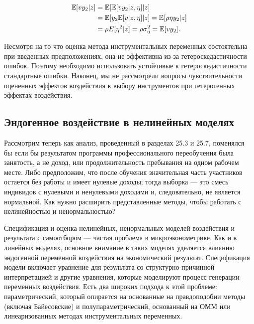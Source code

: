 \begin{align}
\label{eq25.75}
\mathbb{E}[vy_2|z] & = \mathbb{E}[\mathbb{E}[vy_2|z,\eta] | z]  \\
& = \mathbb{E}[y_2 \mathbb{E}[v|z,\eta] | z] = \mathbb{E}[\rho \eta y_2 | z] \nonumber \\
& = \rho E[\eta^2 | z] = \rho \sigma_{\eta}^2 = \mathbb{E}[v y_2]. \nonumber
\end{align}

Несмотря на то что оценка метода инструментальных переменных состоятельна при введенных предположениях, она не эффективна из-за гетероскедастичности ошибок. Поэтому необходимо использовать устойчивые к гетероскедастичности стандартные ошибки. Наконец, мы не рассмотрели вопросы чувствительности оцененных эффектов воздействия к выбору инструментов при гетерогенных эффектах воздействия. 

\subsection{Эндогенное воздействие в нелинейных моделях}

Рассмотрим теперь как анализ, проведенный в разделах 25.3 и 25.7, поменялся бы если бы результатом программы профессионального переобучения была занятость, а не доход, или продолжительность пребывания на одном рабочем месте. Либо предположим, что после обучения значительная часть участников остается без работы и имеет нулевые доходы; тогда выборка --- это смесь индивидов с нулевыми и ненулевыми доходами и, следовательно, не является нормальной. Как нужно расширить представленные методы, чтобы работать с нелинейностью и ненормальностью?

Спецификация и оценка нелинейных, ненормальных моделей воздействия и результата с самоотбором --- частая проблема в микроэконометрике. Как и в линейных моделях, основное внимание в таких моделях уделяется влиянию эндогенной переменной воздействия на экономический результат. Спецификация модели включает уравнение для результата со структурно-причинной интерпретацией и другие уравнения, которые моделируют процесс генерации переменных воздействия. Есть два широких подхода к этой проблеме: параметрический, который опирается на основанные на правдоподобии методы (включая Байесовские) и полупараметрический, основанный на ОММ или линеаризованных методах инструментальных переменных. 

